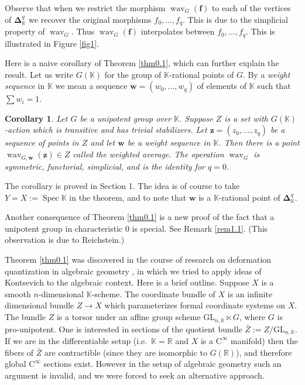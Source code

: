 \documentclass[10pt]{amsart}
\newtheorem{cor}[equation]{Corollary}
\theoremstyle{definition}
\numberwithin{equation}{section}
\newcommand{\opn}{\operatorname}
\newcommand{\mrm}[1]{\mathrm{#1}}
\newcommand{\mbb}[1]{\mathbb{#1}}
\newcommand{\bsym}[1]{\boldsymbol{#1}}
\newcommand{\K}{\mbb{K}}
\begin{document}
Observe that when we restrict the morphism 
$\opn{wav}_G(\bsym{f})$ to each of the vertices of 
$\bsym{\Delta}^q_{\K}$ we recover the original morphisms 
$f_0, \ldots, f_q$. This is due to the simplicial property of 
$\opn{wav}_G$. Thus $\opn{wav}_G(\bsym{f})$ interpolates 
between $f_0, \ldots, f_q$. This is illustrated in Figure 
\ref{fig1}.

Here is a naive corollary of Theorem \ref{thm0.1},
which can further explain the result. Let us 
write $G(\K)$ for the group of $\K$-rational points of $G$. 
By a {\em weight sequence} in $\K$ we mean a sequence 
$\bsym{w} = (w_0, \ldots, w_q)$ of elements of $\K$ such that
$\sum w_i = 1$. 

\begin{cor} \label{cor0.1}
Let $G$ be a unipotent group over $\K$.
Suppose $Z$ is a set with $G(\K)$-action which is transitive and 
has trivial stabilizers. Let 
$\bsym{z} = (z_0, \ldots, z_q)$ be a sequence of points in $Z$ and 
let $\bsym{w}$ be a weight sequence in $\K$. Then there is a 
point 
$\opn{wav}_{G, \bsym{w}}(\bsym{z}) \in Z$
called the weighted average. 
The operation $\opn{wav}_{G}$
is symmetric, functorial, simplicial, 
and is the identity for $q = 0$. 
\end{cor}

The corollary is proved in Section 1. The idea is of course to 
take $Y = X := \opn{Spec} \K$ in the theorem, and to note that 
$\bsym{w}$ is a $\K$-rational point of $\bsym{\Delta}^q_{\K}$. 

Another consequence of Theorem \ref{thm0.1} is a new proof of the 
fact that a unipotent group in characteristic $0$ is special. See 
Remark \ref{rem1.1}. (This observation is due to Reichstein.)

Theorem \ref{thm0.1} was discovered in the course of research on 
deformation quantization in algebraic geometry \cite{Ye}, in 
which we tried to apply ideas of Kontsevich \cite{Ko}
to the algebraic context. Here is a brief outline. Suppose $X$ is 
a smooth $n$-dimensional $\K$-scheme. The coordinate bundle of $X$ 
\cite{GK, Ko} is an infinite dimensional bundle $Z \to X$ which 
parameterizes formal coordinate systems on $X$. The bundle $Z$ is 
a torsor under an affine group scheme 
$\mrm{GL}_{n, \K} \ltimes G$, where $G$ is pro-unipotent. One is 
interested in sections of the quotient bundle 
$\bar{Z} := Z / \mrm{GL}_{n, \K}$. If we are in the 
differentiable setup (i.e.\ $\K = \mbb{R}$ and $X$ is a 
$\mrm{C}^{\infty}$ manifold) then the fibers of $\bar{Z}$ are 
contractible (since they are isomorphic to $G(\mbb{R})$), 
and therefore global $\mrm{C}^{\infty}$ sections exist. 
However in the setup of algebraic geometry such an argument is 
invalid, and we were forced to seek an alternative approach.
\end{document}
